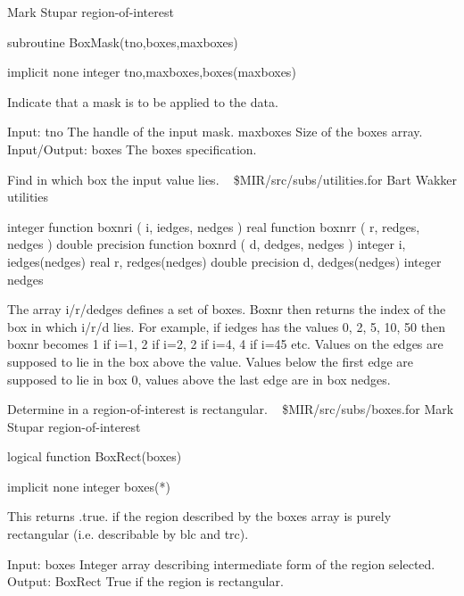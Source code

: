 \newline {} Mark Stupar
\newline {} region-of-interest
\par{\tenpoint
{\eightpoint\begintt
        subroutine BoxMask(tno,boxes,maxboxes)

        implicit none
        integer tno,maxboxes,boxes(maxboxes)

  Indicate that a mask is to be applied to the data.

  Input:
    tno        The handle of the input mask.
    maxboxes   Size of the boxes array.
  Input/Output:
    boxes      The boxes specification.
\endtt}
\par}
%
\noindent Find in which box the input value lies.
\newline \ 
\newline {} \$MIR/src/subs/utilities.for
\newline {} Bart Wakker
\newline {} utilities
\par{\tenpoint
{\eightpoint\begintt
      integer          function boxnri ( i, iedges, nedges )
      real             function boxnrr ( r, redges, nedges )
      double precision function boxnrd ( d, dedges, nedges )
      integer          i, iedges(nedges)
      real             r, redges(nedges)
      double precision d, dedges(nedges)
      integer          nedges

 The array i/r/dedges defines a set of boxes. Boxnr then returns the index of
 the box in which i/r/d lies. For example, if iedges has the values 0, 2, 5,
 10, 50 then boxnr becomes 1 if i=1, 2 if i=2, 2 if i=4, 4 if i=45 etc. Values
 on the edges are supposed to lie in the box above the value. Values below the
 first edge are supposed to lie in box 0, values above the last edge are in
 box nedges.
\endtt}
\par}
%
\noindent Determine in a region-of-interest is rectangular.
\newline \ 
\newline {} \$MIR/src/subs/boxes.for
\newline {} Mark Stupar
\newline \abox{Keywords:} region-of-interest
\par{\tenpoint
{\eightpoint\begintt
        logical function BoxRect(boxes)

        implicit none
        integer boxes(*)

  This returns .true. if the region described by the boxes array is purely
  rectangular (i.e. describable by blc and trc).

  Input:
    boxes      Integer array describing intermediate form of the region
               selected.
  Output:
    BoxRect    True if the region is rectangular.
\endtt}
\par}

